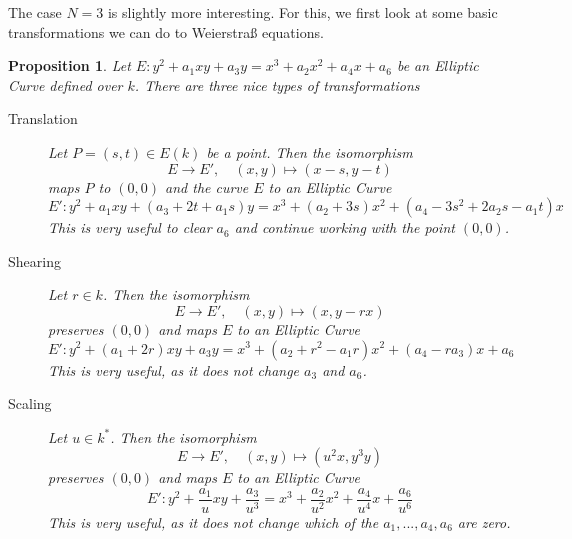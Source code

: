 \documentclass{scrartcl}
\newtheorem{prop}{Proposition}
\theoremstyle{definition}
\begin{document}
The case $N = 3$ is slightly more interesting.
For this, we first look at some basic transformations we can do to Weierstraß equations.
\begin{prop}
    \label{prop:weierstrass_transformations}
    Let $E: y^2 + a_1 x y + a_3 y = x^3 + a_2 x^2 + a_4 x + a_6$ be an Elliptic Curve defined over $k$.
    There are three nice types of transformations
    \begin{description}
        \item[Translation] Let $P = (s, t) \in E(k)$ be a point. Then the isomorphism
        \begin{equation*}
            E \to E', \quad (x, y) \mapsto (x - s, y - t)
        \end{equation*}
        maps $P$ to $(0, 0)$ and the curve $E$ to an Elliptic Curve
        \begin{equation*}
            E': y^2 + a_1 x y + (a_3 + 2t + a_1 s) y = x^3 + (a_2 + 3 s) x^2 + (a_4 - 3 s^2 + 2 a_2 s - a_1 t) x
        \end{equation*}
        This is very useful to clear $a_6$ and continue working with the point $(0, 0)$.
        \item[Shearing] Let $r \in k$. Then the isomorphism
        \begin{equation*}
            E \to E', \quad (x, y) \mapsto (x, y - r x)
        \end{equation*}
        preserves $(0, 0)$ and maps $E$ to an Elliptic Curve
        \begin{equation*}
            E': y^2 + (a_1 + 2r) x y + a_3 y = x^3 + (a_2 + r^2 - a_1 r) x^2 + (a_4 - r a_3) x + a_6
        \end{equation*}
        This is very useful, as it does not change $a_3$ and $a_6$.
        \item[Scaling] Let $u \in k^*$. Then the isomorphism
        \begin{equation*}
            E \to E', \quad (x, y) \mapsto (u^2 x, y^3 y)
        \end{equation*}
        preserves $(0, 0)$ and maps $E$ to an Elliptic Curve
        \begin{equation*}
            E': y^2 + \frac {a_1} u x y + \frac {a_3} {u^3} = x^3 + \frac {a_2} {u^2} x^2 + \frac {a_4} {u^4} x + \frac {a_6} {u^6}
        \end{equation*}
        This is very useful, as it does not change which of the $a_1, ..., a_4, a_6$ are zero.
    \end{description}
\end{prop}
\end{document}
